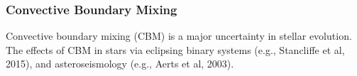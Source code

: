 {\color{purple}
\subsubsection{Convective Boundary Mixing}
}

Convective boundary mixing (CBM) is a major uncertainty in stellar evolution. The effects of CBM in stars via eclipsing binary systems (e.g., Stancliffe et al, 2015), and asteroseismology (e.g., Aerts et al, 2003).

